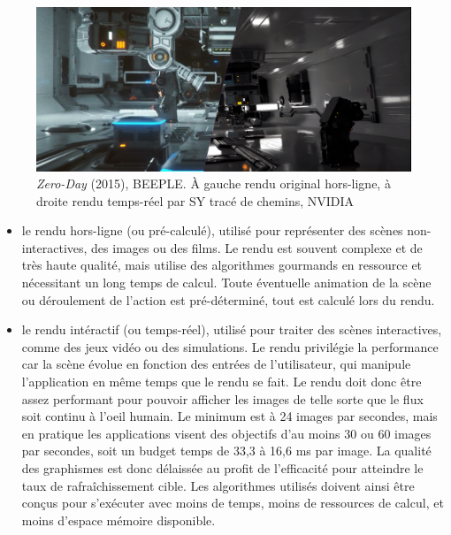 \begin{figure}[h!]
    \centering
    \includegraphics[width=\textwidth]{contenu/resources/images/zero_day_comparison}
    \caption[{\it Zero-Day} (2015), BEEPLE]{{\it Zero-Day} (2015), BEEPLE. À gauche rendu original hors-ligne, à droite rendu temps-réel par SY tracé de chemins, NVIDIA~\cite{ZeroDay}}
    \label{fig:zero-day}
\end{figure}

\begin{itemize}
    \item le rendu hors-ligne (ou pré-calculé), utilisé pour représenter des scènes non-interactives, des images ou des films. Le rendu est souvent complexe et de très haute qualité, mais utilise des algorithmes gourmands en ressource et nécessitant un long temps de calcul. Toute éventuelle animation de la scène ou déroulement de l'action est pré-déterminé, tout est calculé lors du rendu.
    \item le rendu intéractif (ou temps-réel), utilisé pour traiter des scènes interactives, comme des jeux vidéo ou des simulations. Le rendu privilégie la performance car la scène évolue en fonction des entrées de l'utilisateur, qui manipule l'application en même temps que le rendu se fait. Le rendu doit donc être assez performant pour pouvoir afficher les images de telle sorte que le flux soit continu à l'oeil humain. Le minimum est à 24 images par secondes, mais en pratique les applications visent des objectifs d'au moins 30 ou 60 images par secondes, soit un budget temps de 33,3 à 16,6 ms par image. La qualité des graphismes est donc délaissée au profit de l'efficacité pour atteindre le taux de rafraîchissement cible. Les algorithmes utilisés doivent ainsi être conçus pour s'exécuter avec moins de temps, moins de ressources de calcul, et moins d'espace mémoire disponible.
\end{itemize}

\bigskip

